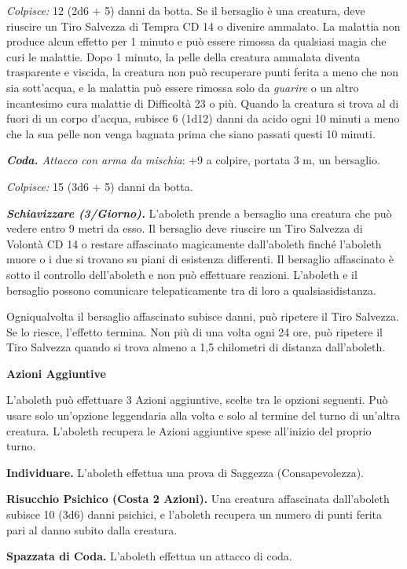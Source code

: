 \begin{multicols}{2}
\emph{Colpisce:} 12 (2d6 + 5) danni da botta. Se il bersaglio è una creatura, deve riuscire un Tiro Salvezza di Tempra CD 14 o divenire ammalato. La malattia non produce alcun effetto per 1 minuto e può essere rimossa da qualsiasi magia che curi le malattie. Dopo 1 minuto, la pelle della creatura ammalata diventa trasparente e viscida, la creatura non può recuperare punti ferita a meno che non sia sott'acqua, e la malattia può essere rimossa solo da \emph{guarire} o un altro incantesimo cura malattie di Difficoltà 23 o più. Quando la creatura si trova al di fuori di un corpo d'acqua, subisce 6 (1d12) danni da acido ogni 10 minuti a meno che la sua pelle non venga bagnata prima che siano passati questi 10 minuti.

\emph{\textbf{Coda.} Attacco con arma da mischia}: +9 a colpire, portata 3 m, un bersaglio.

\emph{Colpisce:} 15 (3d6 + 5) danni da botta.

\emph{\textbf{Schiavizzare (3/Giorno).}} L'aboleth prende a bersaglio una creatura che può vedere entro 9 metri da esso. Il bersaglio deve riuscire un Tiro Salvezza di Volontà CD 14 o restare affascinato magicamente dall'aboleth finché l'aboleth muore o i due si trovano su piani di esistenza differenti. Il bersaglio affascinato è sotto il controllo dell'aboleth e non può effettuare reazioni. L'aboleth e il bersaglio possono comunicare telepaticamente tra di loro a qualsiasidistanza. 

Ogniqualvolta il bersaglio affascinato subisce danni, può ripetere il Tiro Salvezza. Se lo riesce, l'effetto termina. Non più di una volta ogni 24 ore, può ripetere il Tiro Salvezza quando si trova almeno a 1,5 chilometri di distanza dall'aboleth.

\textbf{Azioni Aggiuntive}

L'aboleth può effettuare 3 Azioni aggiuntive, scelte tra le opzioni seguenti. Può usare solo un'opzione leggendaria alla volta e solo al termine del turno di un'altra creatura. L'aboleth recupera le Azioni aggiuntive spese all'inizio del proprio turno.

\textbf{Individuare.} L'aboleth effettua una prova di Saggezza (Consapevolezza).

\textbf{Risucchio Psichico (Costa 2 Azioni).} Una creatura affascinata dall'aboleth subisce 10 (3d6) danni psichici, e l'aboleth recupera un numero di punti ferita pari al danno subito dalla creatura.

\textbf{Spazzata di Coda.} L'aboleth effettua un attacco di coda.


\end{multicols}
